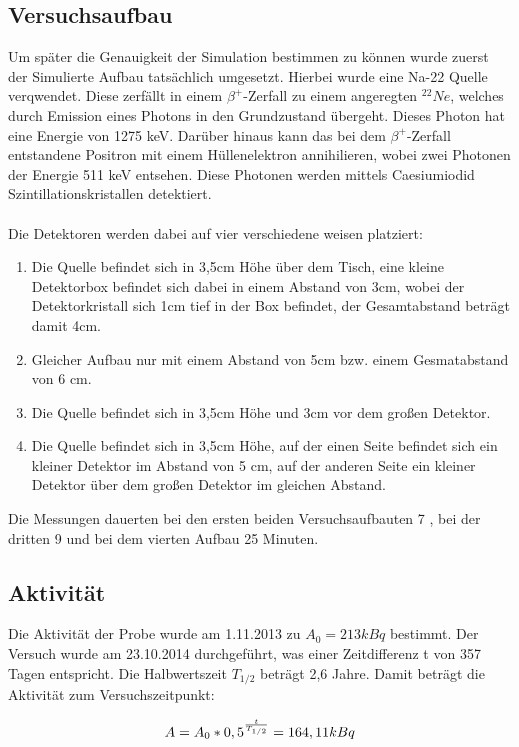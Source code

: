 \documentclass[a4paper,11pt,twoside]{article}
\begin{document}
\subsection{Versuchsaufbau}
Um später die Genauigkeit der Simulation bestimmen zu können wurde zuerst der Simulierte Aufbau tatsächlich umgesetzt. Hierbei wurde eine Na-22 Quelle verqwendet. Diese zerfällt in einem $\beta^+$-Zerfall zu einem angeregten $^{22}Ne$, welches durch Emission eines Photons in den Grundzustand übergeht. Dieses Photon hat eine Energie von 1275 keV. Darüber hinaus kann das bei  dem $\beta^+$-Zerfall entstandene Positron mit einem Hüllenelektron annihilieren, wobei zwei Photonen der Energie 511 keV entsehen.
Diese Photonen werden mittels Caesiumiodid Szintillationskristallen detektiert. \\\\Die Detektoren werden dabei auf vier verschiedene weisen platziert:
%
\begin{enumerate}
    \item Die Quelle befindet sich in 3,5cm Höhe über dem Tisch, eine kleine Detektorbox befindet sich dabei in einem Abstand von 3cm, wobei der Detektorkristall sich 1cm tief in der Box befindet, der Gesamtabstand beträgt damit 4cm.
    \item Gleicher Aufbau nur mit einem Abstand von 5cm bzw. einem Gesmatabstand von 6 cm.
    \item Die Quelle befindet sich in 3,5cm Höhe und 3cm vor dem großen Detektor.
    \item Die Quelle befindet sich in 3,5cm Höhe, auf der einen Seite befindet sich ein kleiner Detektor im Abstand von 5 cm, auf der anderen Seite ein kleiner Detektor über dem großen Detektor im gleichen Abstand.
\end{enumerate}
%
Die Messungen dauerten bei den ersten beiden Versuchsaufbauten 7 , bei der dritten 9  und bei dem vierten Aufbau 25 Minuten.

\subsection{Aktivität}
Die Aktivität der Probe wurde am 1.11.2013 zu $A_0=213 kBq$ bestimmt. Der Versuch wurde am 23.10.2014 durchgeführt, was einer Zeitdifferenz t von 357 Tagen entspricht. Die Halbwertszeit $T_{1/2}$ beträgt 2,6 Jahre. Damit beträgt die Aktivität zum Versuchszeitpunkt:

\begin{equation}
A=A_0*0,5^{t\over T_{1/2}}=164,11 kBq
\end{equation}
\end{document}
